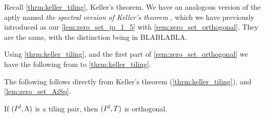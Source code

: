 \documentclass[../thesis.tex]{subfiles}
\begin{document}
  



Recall \cref{thrm:keller_tiling}, Keller's theorem. We have an analogous version of the  aptly named \emph{the spectral version of Keller's theorem} \cite{iosevichSpectralTilingProperties1998}, which we have previously introduced as our \cref{lem:zero_set_jp_1_5} with \cref{rem:zero_set_orthogonal}. They are the same, with the distinction being in BLABLABLA. 


Using \cref{thrm:keller_tiling}, and the first part of \cref{rem:zero_set_orthogonal} we have the following  from to \cref{thrm:keller_tiling}. 


The following  follows directly from Keller's theorem (\cref{thrm:keller_tiling}), and \cref{lem:zero_set_AiSp}.

\begin{corollary}\label{cor:tiling_pair_implies_orthogonal}
    If $(I^d, \Lambda)$ is a tiling pair, then $(I^d,T)$ is orthogonal. %
\end{corollary}
\end{document}
